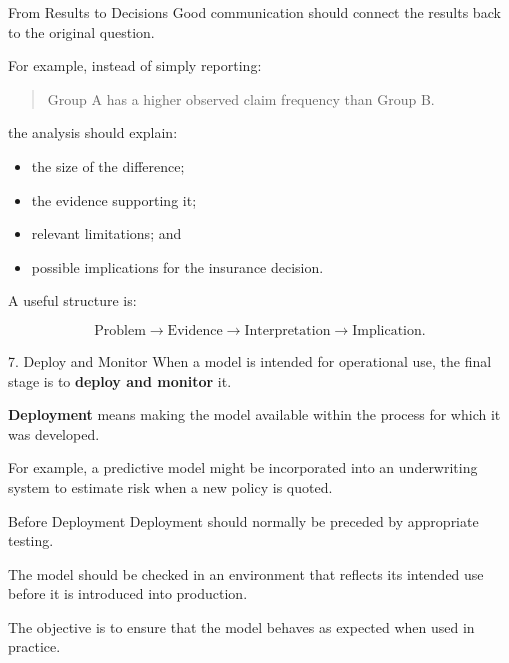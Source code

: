 \documentclass[
  ignorenonframetext,
  aspectratio=169,
]{beamer}
\providecommand{\tightlist}{%
  \setlength{\itemsep}{0pt}\setlength{\parskip}{0pt}}
\begin{document}
\begin{frame}{From Results to Decisions}
\protect{}\label{from-results-to-decisions}
Good communication should connect the results back to the original
question.

For example, instead of simply reporting:

\begin{quote}
Group A has a higher observed claim frequency than Group B.
\end{quote}

the analysis should explain:

\begin{itemize}
\tightlist
\item
  the size of the difference;
\item
  the evidence supporting it;
\item
  relevant limitations; and
\item
  possible implications for the insurance decision.
\end{itemize}

A useful structure is:

\[
\text{Problem}
\rightarrow
\text{Evidence}
\rightarrow
\text{Interpretation}
\rightarrow
\text{Implication}.
\]
\end{frame}

\begin{frame}{7. Deploy and Monitor}
\protect{}\label{deploy-and-monitor}
When a model is intended for operational use, the final stage is to
\textbf{deploy and monitor} it.

\textbf{Deployment} means making the model available within the process
for which it was developed.

For example, a predictive model might be incorporated into an
underwriting system to estimate risk when a new policy is quoted.
\end{frame}

\begin{frame}{Before Deployment}
\protect{}\label{before-deployment}
Deployment should normally be preceded by appropriate testing.

The model should be checked in an environment that reflects its intended
use before it is introduced into production.

The objective is to ensure that the model behaves as expected when used
in practice.
\end{frame}
\end{document}
